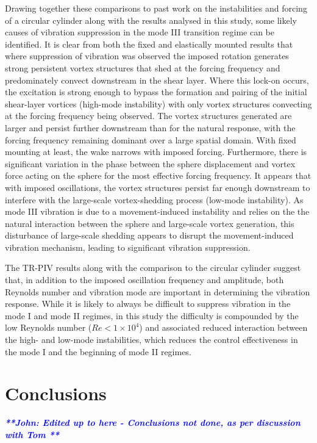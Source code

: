 \documentclass[3p]{elsarticle}
\newcommand{\js}[1]{{\textcolor{blue}{{\bf{\it{ **John: #1 **}}}}}}
\begin{document}
Drawing together these comparisons to past work on the instabilities and forcing of a circular cylinder along with the results analysed in this study, some likely causes of vibration suppression in the mode III transition regime can be identified. 
It is clear from both the fixed and elastically mounted results that where suppression of vibration was observed the imposed rotation generates strong persistent vortex structures that shed at the forcing frequency and predominately convect downstream in the shear layer. 
Where this lock-on occurs, the excitation is strong enough to bypass the formation and pairing of the initial shear-layer vortices (high-mode instability) with only vortex structures convecting at the forcing frequency being observed. 
The vortex structures generated are larger and persist further downstream than for the natural response, with the forcing frequency remaining dominant over a large spatial domain. 
With fixed mounting at least, the wake narrows with imposed forcing. 
Furthermore, there is significant variation in the phase between the sphere displacement and vortex force acting on the sphere for the most effective forcing frequency. 
It appears that with imposed oscillations, the vortex structures persist far enough downstream to interfere with the large-scale vortex-shedding process (low-mode instability). 
As mode III vibration is due to a movement-induced instability and relies on the the natural interaction between the sphere and large-scale vortex generation, this disturbance of large-scale shedding appears to disrupt the movement-induced vibration mechanism, leading to significant vibration suppression.

The TR-PIV results along with the comparison to the circular cylinder suggest that, in addition to the imposed oscillation frequency and amplitude, both Reynolds number and vibration mode are important in determining the vibration response. 
While it is likely to always be difficult to suppress vibration in the mode I and mode II regimes, in this study the difficulty is compounded by the low Reynolds number ($Re<1\times10^4$) and associated reduced interaction between the high- and low-mode instabilities, which reduces the control effectiveness in the mode I and the beginning of mode II regimes. 

\section{Conclusions}
\label{sec:concl}
\js{Edited up to here - Conclusions not done, as per discussion with Tom}
\end{document}
